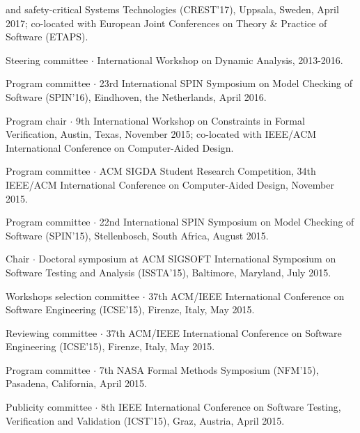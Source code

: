 \documentclass[ComputerScience]{vita}
\begin{document}
\begin{vita}
\begin{Panel and Committee Service}
  and safety-critical Systems Technologies (CREST'17), Uppsala,
  Sweden, April 2017; co-located with European Joint Conferences on
  Theory \& Practice of Software (ETAPS).
\item Steering committee $\cdot$ International Workshop on Dynamic Analysis, 2013-2016.
\item Program committee $\cdot$ 23rd International SPIN Symposium on Model Checking of Software (SPIN'16), Eindhoven, the Netherlands, April 2016.
\item Program chair $\cdot$ 9th International Workshop on Constraints in Formal Verification, Austin, Texas, November 2015; co-located with IEEE/ACM International Conference on Computer-Aided Design.
\item Program committee $\cdot$ ACM SIGDA Student Research Competition, 34th IEEE/ACM International Conference on Computer-Aided Design, November 2015.
\item Program committee $\cdot$ 22nd International SPIN Symposium on Model Checking of Software (SPIN'15), Stellenbosch, South Africa, August 2015.
\item Chair $\cdot$ Doctoral symposium at ACM SIGSOFT International Symposium on Software Testing and Analysis (ISSTA'15), Baltimore, Maryland, July 2015. 
\item Workshops selection committee $\cdot$ 37th ACM/IEEE International Conference on Software Engineering (ICSE'15), Firenze, Italy, May 2015.
\item Reviewing committee $\cdot$ 37th ACM/IEEE International Conference on Software Engineering (ICSE'15), Firenze, Italy, May 2015.
\item Program committee $\cdot$ 7th NASA Formal Methods Symposium (NFM'15), Pasadena, California, April 2015. 
\item Publicity committee $\cdot$ 8th IEEE International Conference on Software Testing, Verification and Validation (ICST'15), Graz, Austria, April 2015.

\end{Panel and Committee Service}
\end{vita}
\end{document}
